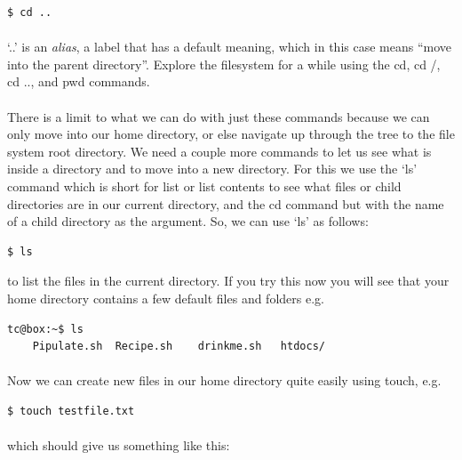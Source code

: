 \documentclass[12pt, a4paper, twoside]{book}
\begin{document}
\begin{lstlisting}[style=DOS]
    $ cd ..
\end{lstlisting}
\paragraph{} `..' is an \emph{alias}, a label that has a default meaning, which in this case means ``move into the parent directory''. Explore the filesystem for a while using the cd, cd /, cd .., and pwd commands.

\paragraph{} There is a limit to what we can do with just these commands because we can only move into our home directory, or else navigate up through the tree to the file system root directory. We need a couple more commands to let us see what is inside a directory and to move into a new directory. For this we use the `ls' command which is short for list or list contents to see what files or child directories are in our current directory, and the cd command but with the name of a child directory as the argument. So, we can use `ls' as follows:

\begin{lstlisting}[style=DOS]
    $ ls
\end{lstlisting}

to list the files in the current directory. If you try this now you will see that your home directory contains a few default files and folders
e.g.

\begin{lstlisting}[style=DOS]
    tc@box:~$ ls
    Pipulate.sh  Recipe.sh    drinkme.sh   htdocs/
\end{lstlisting}

\paragraph{} Now we can create new files in our home directory quite easily using touch, e.g.

\begin{lstlisting}[style=DOS]
    $ touch testfile.txt
\end{lstlisting}

\paragraph{} which should give us something like this:
\end{document}
